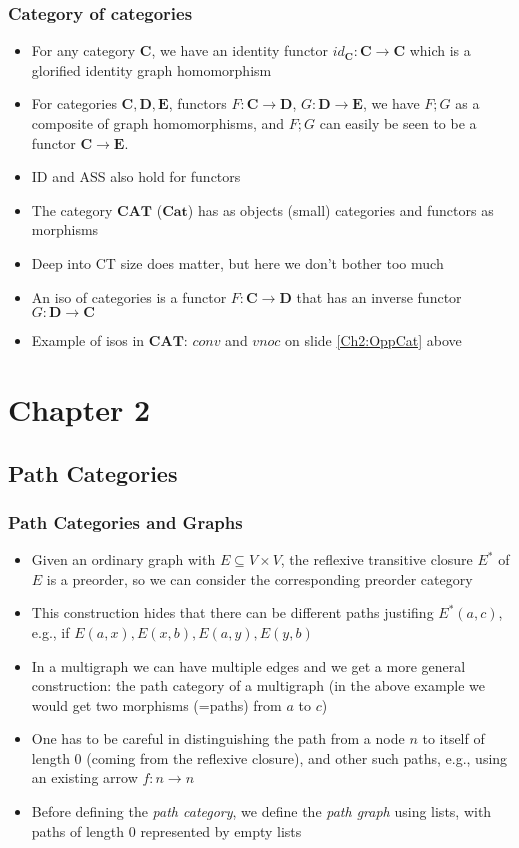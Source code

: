 \documentclass[handout]{beamer}
\newcommand{\bfsf}[1]{{\boldsymbol{#1}}}
\newcommand{\CC}{\bfsf{C}}
\newcommand{\DD}{\bfsf{D}}
\newcommand{\EE}{\bfsf{E}}
\newcommand{\Cat}{\bfsf{Cat}}
\newcommand{\CAT}{\bfsf{CAT}}
\begin{document}
\frame
  {   
    \frametitle{Category of categories}\label{Ch2:CatofCats}

 \begin{itemize}[<+->]
\item For any category $\CC$, we have an identity functor $id_\CC : \CC\to\CC$ 
which is a glorified identity graph homomorphism
\item For categories $\CC,\DD,\EE$, functors $F:\CC\to\DD$, $G:\DD\to\EE$,
we have $F;G$ as a composite of graph homomorphisms, and $F;G$ can easily
be seen to be a functor $\CC\to\EE$.
\item ID and ASS also hold for functors
\item The category $\CAT$ ($\Cat$) has as objects (small) categories
and functors as morphisms
\item Deep into CT size does matter, but here we don't bother too much 
\item An iso of categories is a functor $F: \CC\to\DD$ that has an 
inverse functor $G:\DD\to\CC$
\item Example of isos in $\CAT$: $conv$ and $vnoc$ on slide \ref{Ch2:OppCat} above
 \end{itemize}

 }




\section{Chapter 2}
\subsection{Path Categories}

\frame
  {   
    \frametitle{Path Categories and Graphs}\label{Ch2:PathCatsGras}

 \begin{itemize}[<+->]
\item Given an ordinary graph with $E\subseteq V\times V$, the
reflexive transitive closure $E^*$ of $E$ is a preorder,
so we can consider the corresponding preorder category
\item This construction hides that there can be different paths
justifing $E^*(a,c)$, e.g., if $E(a,x), E(x,b), E(a,y), E(y,b)$
\item In a multigraph we can have multiple edges and we get
a more general construction: the path category of a multigraph
(in the above example we would get two morphisms (=paths) from $a$ to $c$)
\item One has to be careful in distinguishing the path from a node $n$ to itself
of length 0 (coming from the reflexive closure), and other such paths, 
e.g., using an existing arrow $f: n\to n$
\item Before defining the \emph{path category}, we define the
\emph{path graph} using lists, with paths of length 0 represented by empty lists
 \end{itemize}

 }
\end{document}
